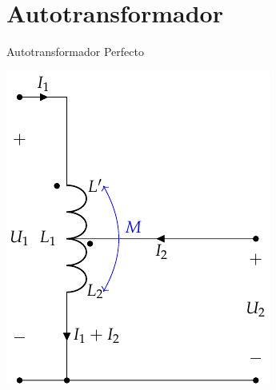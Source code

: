 \documentclass[aspectratio=169, usenames,svgnames,dvipsnames]{beamer}
\begin{document}
\section{Autotransformador}
\label{sec:orgd986889}
\begin{frame}[label={sec:org2ce7071}]{Autotransformador Perfecto}
\begin{center}
\includegraphics[height=0.9\textheight]{../figs/AutotrafoPerfecto.pdf}
\end{center}
\end{frame}
\end{document}
